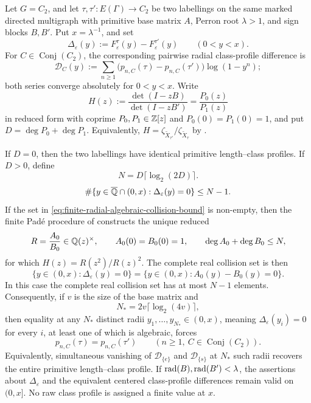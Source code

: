 \begin{theorem}
\label{thm:finite-radial-sampling}
Let \(G=C_2\), and let
\(\tau,\tau':E(\Gamma)\to C_2\) be two labellings on the same marked
directed multigraph with primitive base matrix \(A\), Perron root
\(\lambda>1\), and sign blocks \(B,B'\).  Put \(x=\lambda^{-1}\), and set
\[
 \Delta_\varepsilon(y)
 :=F_\varepsilon^\tau(y)-F_\varepsilon^{\tau'}(y)
 \qquad(0<y<x).
\]
For
\(C\in\operatorname{Conj}(C_2)\), the corresponding pairwise radial
class-profile difference is
\[
 \mathcal D_C(y):=\sum_{n\ge1}
 \bigl(p_{n,C}(\tau)-p_{n,C}(\tau')\bigr)\log(1-y^n);
\]
both series converge absolutely for \(0<y<x\).  Write
\[
 H(z):=\frac{\det(I-zB)}{\det(I-zB')}
      =\frac{P_0(z)}{P_1(z)}
\]
in reduced form with coprime \(P_0,P_1\in\mathbb{Z}[z]\) and
\(P_0(0)=P_1(0)=1\), and put \(D=\deg P_0+\deg P_1\).
Equivalently, \(H=\zeta_{\widetilde X_{\tau'}}/
\zeta_{\widetilde X_\tau}\) by .

If \(D=0\), then the two labellings have identical primitive
length--class profiles.  If \(D>0\), define
\[
 N=D\lceil\log_2(2D)\rceil.
\]
\begin{equation}\label{eq:finite-radial-algebraic-collision-bound}
 \#\{y\in\overline{\mathbb{Q}}\cap(0,x):
          \Delta_\varepsilon(y)=0\}\le N-1.
\end{equation}
If the set in
\eqref{eq:finite-radial-algebraic-collision-bound} is non-empty, then the
finite Pad\'e procedure of
 constructs the unique reduced
\[
 R=\frac{A_0}{B_0}\in\mathbb{Q}(z)^\times,
 \qquad A_0(0)=B_0(0)=1,
 \qquad \deg A_0+\deg B_0\le N,
\]
for which \(H(z)=R(z^2)/R(z)^2\).  The complete real collision set is then
\begin{equation}\label{eq:finite-radial-complete-collision-set}
 \{y\in(0,x):\Delta_\varepsilon(y)=0\}
 =\{y\in(0,x):A_0(y)-B_0(y)=0\}.
\end{equation}
In this case the complete real collision set has at most \(N-1\) elements.
Consequently, if \(v\) is the size of the base matrix and
\[
 N_*=2v\lceil\log_2(4v)\rceil,
\]
then equality at any \(N_*\) distinct radii
\(y_1,\ldots,y_{N_*}\in(0,x)\), meaning
\(\Delta_\varepsilon(y_i)=0\) for every \(i\), at least one of which is
algebraic, forces
\[
 p_{n,C}(\tau)=p_{n,C}(\tau')
 \qquad(n\ge1,\ C\in\operatorname{Conj}(C_2)).
\]
Equivalently, simultaneous vanishing of
\(\mathcal D_{\{e\}}\) and \(\mathcal D_{\{s\}}\) at \(N_*\) such radii
recovers the entire primitive length--class profile.
If \(\operatorname{rad}(B),\operatorname{rad}(B')<\lambda\), the assertions about
\(\Delta_\varepsilon\) and the equivalent centered class-profile differences
remain valid on \((0,x]\).  No raw class profile is assigned a finite value at
\(x\).
\end{theorem}

